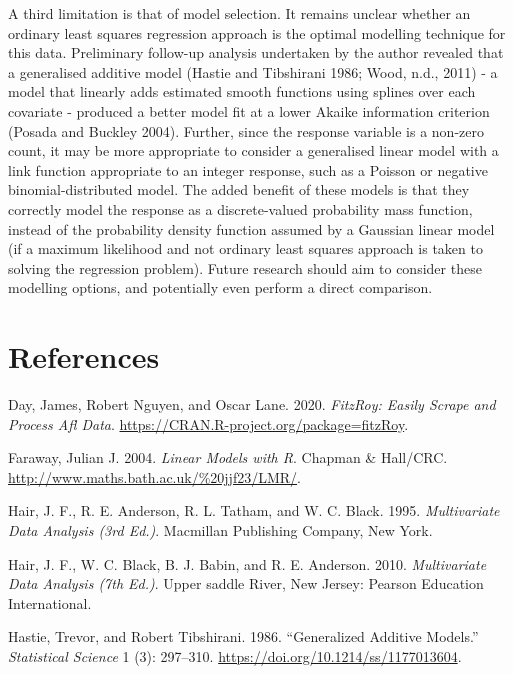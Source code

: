 \documentclass{article}
\begin{document}
A third limitation is that of model selection. It remains unclear
whether an ordinary least squares regression approach is the optimal
modelling technique for this data. Preliminary follow-up analysis
undertaken by the author revealed that a generalised additive model
(Hastie and Tibshirani 1986; Wood, n.d., 2011) - a model that linearly
adds estimated smooth functions using splines over each covariate -
produced a better model fit at a lower Akaike information criterion
(Posada and Buckley 2004). Further, since the response variable is a
non-zero count, it may be more appropriate to consider a generalised
linear model with a link function appropriate to an integer response,
such as a Poisson or negative binomial-distributed model. The added
benefit of these models is that they correctly model the response as a
discrete-valued probability mass function, instead of the probability
density function assumed by a Gaussian linear model (if a maximum
likelihood and not ordinary least squares approach is taken to solving
the regression problem). Future research should aim to consider these
modelling options, and potentially even perform a direct comparison.

\pagebreak

\hypertarget{references}{%
\section*{References}\label{references}}

\hypertarget{refs}{}
\leavevmode\hypertarget{ref-fitzRoy}{}%
Day, James, Robert Nguyen, and Oscar Lane. 2020. \emph{FitzRoy: Easily
Scrape and Process Afl Data}.
\url{https://CRAN.R-project.org/package=fitzRoy}.

\leavevmode\hypertarget{ref-R:Faraway:2004}{}%
Faraway, Julian J. 2004. \emph{Linear Models with R}. Chapman \&
Hall/CRC. \url{http://www.maths.bath.ac.uk/\%20jjf23/LMR/}.

\leavevmode\hypertarget{ref-multi2}{}%
Hair, J. F., R. E. Anderson, R. L. Tatham, and W. C. Black. 1995.
\emph{Multivariate Data Analysis (3rd Ed.)}. Macmillan Publishing
Company, New York.

\leavevmode\hypertarget{ref-multi1}{}%
Hair, J. F., W. C. Black, B. J. Babin, and R. E. Anderson. 2010.
\emph{Multivariate Data Analysis (7th Ed.)}. Upper saddle River, New
Jersey: Pearson Education International.

\leavevmode\hypertarget{ref-10.1214ux2fssux2f1177013604}{}%
Hastie, Trevor, and Robert Tibshirani. 1986. ``Generalized Additive
Models.'' \emph{Statistical Science} 1 (3): 297--310.
\url{https://doi.org/10.1214/ss/1177013604}.
\end{document}
